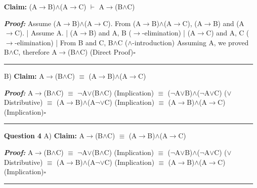 \documentclass{article}
\begin{document}
\textbf{Claim: } (A$\rightarrow$B)$\wedge$(A$\rightarrow$C) $\vdash$ A$\rightarrow$(B$\wedge$C)\newline

\textbf{\textit{Proof: }}\newline
Assume (A$\rightarrow$B)$\wedge$(A$\rightarrow$C).\newline
From (A$\rightarrow$B)$\wedge$(A$\rightarrow$C), (A$\rightarrow$B) and (A$\rightarrow$C).\newline
|	Assume A.\newline
|	(A$\rightarrow$B) and A, B ($\rightarrow$-elimination)\newline
|	(A$\rightarrow$C) and A, C ($\rightarrow$-elimination)\newline
|	From B and C, B$\wedge$C ($\wedge$-introduction)\newline
Assuming A, we proved B$\wedge$C, therefore A$\rightarrow$(B$\wedge$C) (Direct Proof)$\square$\newline\rule{10cm}{1pt}\newline

B) \textbf{Claim: } A$\rightarrow$(B$\wedge$C) $\equiv$ (A$\rightarrow$B)$\wedge$(A$\rightarrow$C)\newline

\textbf{\textit{Proof: }}\newline
A$\rightarrow$(B$\wedge$C) $\equiv$ $\neg$A$\lor$(B$\wedge$C) (Implication)\newline
$\equiv$ ($\neg$A$\lor$B)$\wedge$($\neg$A$\lor$C) ($\lor$ Distributive)\newline
$\equiv$ (A$\rightarrow$B)$\wedge$(A$\neg$$\lor$C) (Implication)\newline
$\equiv$ (A$\rightarrow$B)$\wedge$(A$\rightarrow$C) (Implication)$\square$\newline\rule{10cm}{1pt}\newline



\textbf{Question 4}\newline
A) \textbf{Claim: } A$\rightarrow$(B$\wedge$C) $\equiv$ (A$\rightarrow$B)$\wedge$(A$\rightarrow$C)\newline

\textbf{\textit{Proof: }}\newline
A$\rightarrow$(B$\wedge$C) $\equiv$ $\neg$A$\lor$(B$\wedge$C) (Implication)\newline
$\equiv$ ($\neg$A$\lor$B)$\wedge$($\neg$A$\lor$C) ($\lor$ Distributive)\newline
$\equiv$ (A$\rightarrow$B)$\wedge$(A$\neg$$\lor$C) (Implication)\newline
$\equiv$ (A$\rightarrow$B)$\wedge$(A$\rightarrow$C) (Implication)$\square$\newline\rule{10cm}{1pt}\newline
\end{document}
